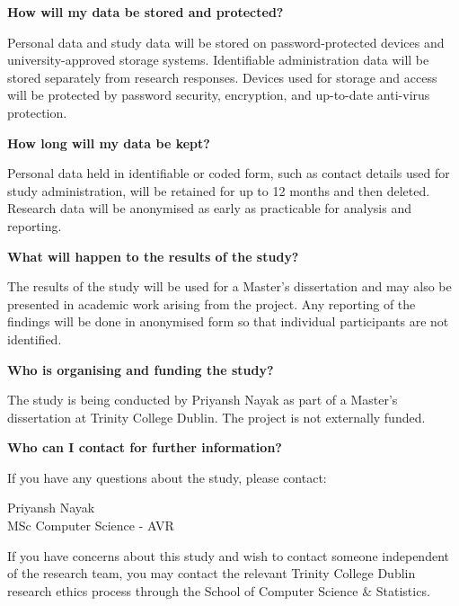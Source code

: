 \textbf{How will my data be stored and protected?}

Personal data and study data will be stored on password-protected devices and university-approved storage systems. Identifiable administration data will be stored separately from research responses. Devices used for storage and access will be protected by password security, encryption, and up-to-date anti-virus protection.

\textbf{How long will my data be kept?}

Personal data held in identifiable or coded form, such as contact details used for study administration, will be retained for up to 12 months and then deleted. Research data will be anonymised as early as practicable for analysis and reporting.

\textbf{What will happen to the results of the study?}

The results of the study will be used for a Master's dissertation and may also be presented in academic work arising from the project. Any reporting of the findings will be done in anonymised form so that individual participants are not identified.

\textbf{Who is organising and funding the study?}

The study is being conducted by Priyansh Nayak as part of a Master's dissertation at Trinity College Dublin. The project is not externally funded.

\textbf{Who can I contact for further information?}

If you have any questions about the study, please contact:

Priyansh Nayak\\
MSc Computer Science - AVR

\smallskip
If you have concerns about this study and wish to contact someone independent of the research team, you may contact the relevant Trinity College Dublin research ethics process through the School of Computer Science \& Statistics.

\endgroup
